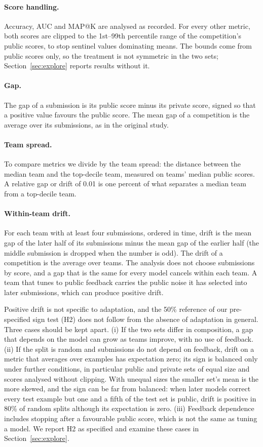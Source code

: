 \documentclass[10pt]{article}
\begin{document}
\paragraph{Score handling.} Accuracy, AUC and MAP@K are analysed as recorded. For every other metric, both scores are clipped to the 1st--99th percentile range of the competition's public scores, to stop sentinel values dominating means. The bounds come from public scores only, so the treatment is not symmetric in the two sets; Section~\ref{sec:explore} reports results without it.

\paragraph{Gap.} The gap of a submission is its public score minus its private score, signed so that a positive value favours the public score. The mean gap of a competition is the average over its submissions, as in the original study.

\paragraph{Team spread.} To compare metrics we divide by the team spread: the distance between the median team and the top-decile team, measured on teams' median public scores. A relative gap or drift of 0.01 is one percent of what separates a median team from a top-decile team.

\paragraph{Within-team drift.} For each team with at least four submissions, ordered in time, drift is the mean gap of the later half of its submissions minus the mean gap of the earlier half (the middle submission is dropped when the number is odd). The drift of a competition is the average over teams. The analysis does not choose submissions by score, and a gap that is the same for every model cancels within each team. A team that tunes to public feedback carries the public noise it has selected into later submissions, which can produce positive drift.

Positive drift is not specific to adaptation, and the 50\% reference of our pre-specified sign test (H2) does not follow from the absence of adaptation in general. Three cases should be kept apart. (i) If the two sets differ in composition, a gap that depends on the model can grow as teams improve, with no use of feedback. (ii) If the split is random and submissions do not depend on feedback, drift on a metric that averages over examples has expectation zero; its sign is balanced only under further conditions, in particular public and private sets of equal size and scores analysed without clipping. With unequal sizes the smaller set's mean is the more skewed, and the sign can be far from balanced: when later models correct every test example but one and a fifth of the test set is public, drift is positive in 80\% of random splits although its expectation is zero. (iii) Feedback dependence includes stopping after a favourable public score, which is not the same as tuning a model. We report H2 as specified and examine these cases in Section~\ref{sec:explore}.
\end{document}
